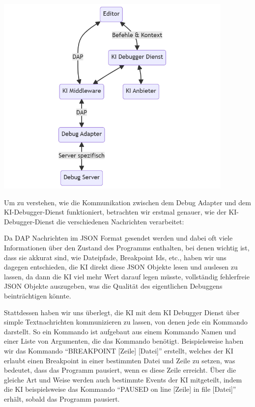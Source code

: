 \documentclass[a4paper,12pt,ngerman]{scrartcl}
\begin{document}
\begin{center}	
	\includegraphics[width=0.875\textwidth]{ai_integration}
\end{center}

Um zu verstehen, wie die Kommunikation zwischen dem Debug Adapter und dem KI-Debugger-Dienst funktioniert, betrachten wir erstmal genauer, wie der KI-Debugger-Dienst die verschiedenen Nachrichten verarbeitet:

Da DAP Nachrichten im JSON Format gesendet werden und dabei oft viele Informationen über den Zustand des Programms enthalten, bei denen wichtig ist, dass sie akkurat sind, wie Dateipfade, Breakpoint Ids, etc., haben wir uns dagegen entschieden, die KI direkt diese JSON Objekte lesen und auslesen zu lassen, da dann die KI viel mehr Wert darauf legen müsste, vollständig fehlerfreie JSON Objekte auszugeben, was die Qualität des eigentlichen Debuggens beinträchtigen könnte.

Stattdessen haben wir uns überlegt, die KI mit dem KI Debugger Dienst über simple Textnachrichten kommunizieren zu lassen, von denen jede ein Kommando darstellt. So ein Kommando ist aufgebaut aus einem Kommando Namen und einer Liste von Argumenten, die das Kommando benötigt. Beispielsweise haben wir das Kommando ``BREAKPOINT [Zeile] [Datei]'' erstellt, welches der KI erlaubt einen Breakpoint in einer bestimmten Datei und Zeile zu setzen, was bedeutet, dass das Programm pausiert, wenn es diese Zeile erreicht. Über die gleiche Art und Weise werden auch bestimmte Events der KI mitgeteilt, indem die KI beispielsweise das Kommando ``PAUSED on line [Zeile] in file [Datei]'' erhält, sobald das Programm pausiert.
\end{document}
